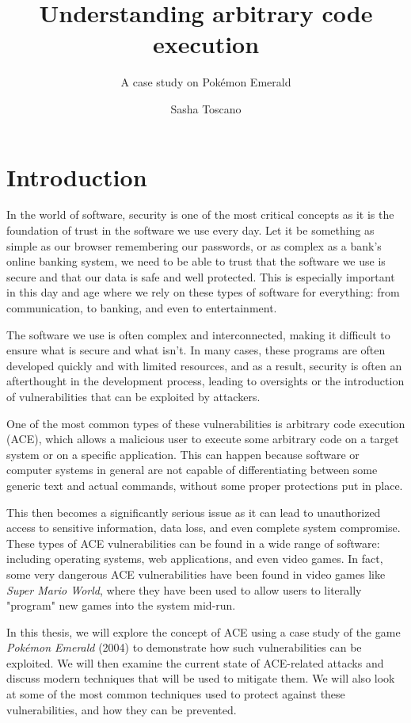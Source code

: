 \documentclass[a4paper]{usiinfbachelorproject}
\author{Sasha Toscano}
\title{\textbf{Understanding arbitrary code
execution}}
\subtitle{A case study on Pokémon Emerald}
\begin{document}
\maketitle
\tableofcontents\newpage

\section{\textbf{Introduction}}
In the world of software, security is one of the most critical concepts as it is the foundation of trust in the software we use every day. Let it be something as simple as our browser remembering our passwords, or as complex as a bank's online banking system, we need to be able to trust that the software we use is secure and that our data is safe and well protected. This is especially important in this day and age where we rely on these types of software for everything: from communication, to banking, and even to entertainment.

The software we use is often complex and interconnected, making it difficult to ensure what is secure and what isn't. In many cases, these programs are often developed quickly and with limited resources, and as a result, security is often an afterthought in the development process, leading to oversights or the introduction of vulnerabilities that can be exploited by attackers.

One of the most common types of these vulnerabilities is arbitrary code execution (ACE), which allows a malicious user to execute some arbitrary code on a target system or on a specific application. This can happen because software or computer systems in general are not capable of differentiating between some generic text and actual commands, without some proper protections put in place.

This then becomes a significantly serious issue as it can lead to unauthorized access to sensitive information, data loss, and even complete system compromise. These types of ACE vulnerabilities can be found in a wide range of software: including operating systems, web applications, and even video games. In fact, some very dangerous ACE vulnerabilities have been found in video games like \textit{Super Mario World}, where they have been used to allow users to literally "program" new games into the system mid-run.

In this thesis, we will explore the concept of ACE using a case study of the game \textit{Pokémon Emerald} (2004) to demonstrate how such vulnerabilities can be exploited. We will then examine the current state of ACE-related attacks and discuss modern techniques that will be used to mitigate them. We will also look at some of the most common techniques used to protect against these vulnerabilities, and how they can be prevented.
\end{document}
